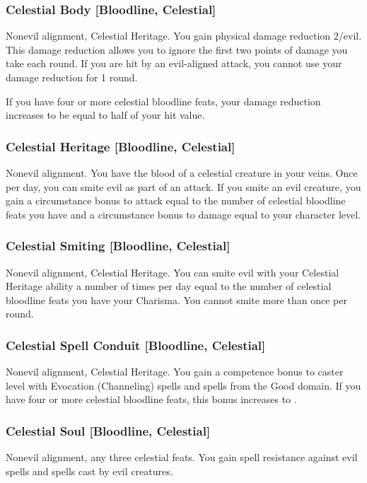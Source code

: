 \subsubsection{Celestial Body [Bloodline, Celestial]}
 Nonevil alignment, Celestial Heritage.
 You gain physical damage reduction 2/evil. This damage reduction allows you to ignore the first two points of damage you take each round. If you are hit by an evil-aligned attack, you cannot use your damage reduction for 1 round.

If you have four or more celestial bloodline feats, your damage reduction increases to be equal to half of your hit value.

\subsubsection{Celestial Heritage [Bloodline, Celestial]}
 Nonevil alignment.
 You have the blood of a celestial creature in your veins. Once per day, you can smite evil as part of an attack. If you smite an evil creature, you gain a circumstance bonus to attack equal to the number of celestial bloodline feats you have and a circumstance bonus to damage equal to your character level.

\subsubsection{Celestial Smiting [Bloodline, Celestial]}
 Nonevil alignment, Celestial Heritage.
 You can smite evil with your Celestial Heritage ability a number of times per day equal to the number of celestial bloodline feats you have \add your Charisma. You cannot smite more than once per round.

\subsubsection{Celestial Spell Conduit [Bloodline, Celestial]}
 Nonevil alignment, Celestial Heritage.
 You gain a  competence bonus to caster level with Evocation (Channeling) spells and spells from the Good domain. If you have four or more celestial bloodline feats, this bonus increases to .

\subsubsection{Celestial Soul [Bloodline, Celestial]}
 Nonevil alignment, any three celestial feats.
 You gain spell resistance against evil spells and spells cast by evil creatures.

